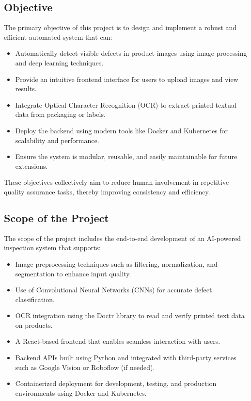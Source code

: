\documentclass[12pt]{report}
\begin{document}
\subsection{Objective}

The primary objective of this project is to design and implement a robust and efficient automated system that can:

\begin{itemize}
    \item Automatically detect visible defects in product images using image processing and deep learning techniques.
    \item Provide an intuitive frontend interface for users to upload images and view results.
    \item Integrate Optical Character Recognition (OCR) to extract printed textual data from packaging or labels.
    \item Deploy the backend using modern tools like Docker and Kubernetes for scalability and performance.
    \item Ensure the system is modular, reusable, and easily maintainable for future extensions.
\end{itemize}

These objectives collectively aim to reduce human involvement in repetitive quality assurance tasks, thereby improving consistency and efficiency.

\subsection{Scope of the Project}

The scope of the project includes the end-to-end development of an AI-powered inspection system that supports:

\begin{itemize}
    \item Image preprocessing techniques such as filtering, normalization, and segmentation to enhance input quality.
    \item Use of Convolutional Neural Networks (CNNs) for accurate defect classification.
    \item OCR integration using the Doctr library to read and verify printed text data on products.
    \item A React-based frontend that enables seamless interaction with users.
    \item Backend APIs built using Python and integrated with third-party services such as Google Vision or Roboflow (if needed).
    \item Containerized deployment for development, testing, and production environments using Docker and Kubernetes.
\end{itemize}
\end{document}
